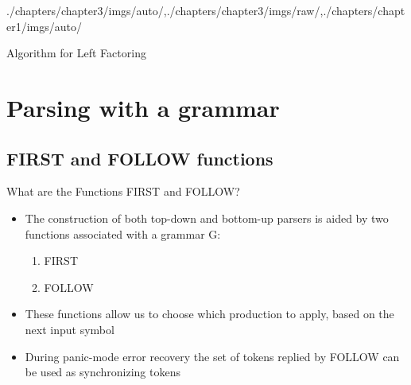 \begin{graphicspathcontext}{{./chapters/chapter3/imgs/auto/},{./chapters/chapter3/imgs/raw/},{./chapters/chapter1/imgs/auto/}}
\begin{bibunit}[apalike]
\begin{frame}{Algorithm for Left Factoring}
	\begin{myalgorithm}
	\BlankLine
	\end{myalgorithm}
\end{frame}

\section{Parsing with a grammar}
\sectiontableofcontentslide*

\subsection{FIRST and FOLLOW functions}

\begin{frame}[background=6]{{What are the Functions} FIRST and FOLLOW?}
	\begin{itemize}
	\item The construction of both top-down and bottom-up parsers is aided by two functions associated with a grammar G:
		\begin{enumerate}
		\item FIRST
		\item FOLLOW
		\end{enumerate}
	\vfill
	\item These functions allow us to choose which production to apply, based on the next input symbol
	\vfill
	\item During panic-mode error recovery the set of tokens replied by FOLLOW can be used as synchronizing tokens
	\end{itemize}
\end{frame}


\end{bibunit}
\end{graphicspathcontext}
